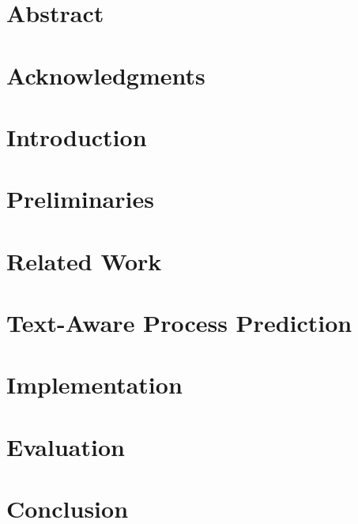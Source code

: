 \documentclass[a4paper,
11pt,
openright,
cleardoublepage=empty,
twoside
]{pads-thesis}
\begin{document}


\gTitlePage

\chapter*{Abstract}%


\chapter*{Acknowledgments} %


\pagestyle{plain}
\tableofcontents

\listoffigures {}

\listoftables {}


\cleardoublepage
\pagestyle{fancy}

\chapter{Introduction} \label{chap:intro}


\chapter{Preliminaries} \label{chap:prelim}


\chapter{Related Work} \label{chap:related_work}


\chapter{Text-Aware Process Prediction} \label{chap:concept}


\chapter{Implementation} \label{chap:impl}


\chapter{Evaluation} \label{chap:eval}


\chapter{Conclusion} \label{chap:conclusion}


\end{document}
